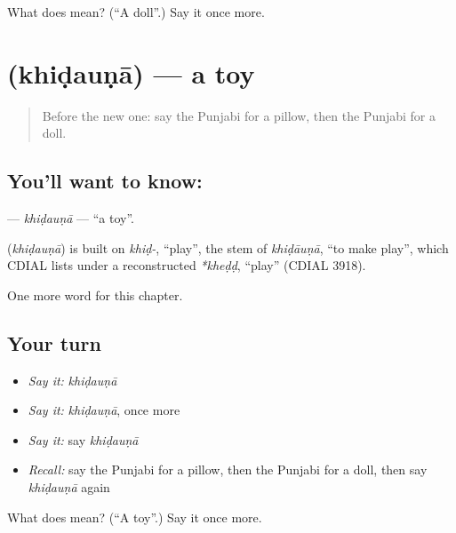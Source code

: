 \begin{tcolorbox}[breakable,colback=teal!4,colframe=teal!35!black,title={Before you move on}]
What does  mean? (\textquotedblleft{}A doll\textquotedblright{}.) Say it once more.
\end{tcolorbox}
\section[\texorpdfstring{\pa{ਖਿਡੌਣਾ} (khiḍauṇā)}{ਖਿਡੌਣਾ (khiḍauṇā)}]{ (khiḍauṇā) — a toy}

\label{lesson:PA-C118-khidauna}



\begin{quote}
Before the new one: say the Punjabi for a pillow, then the Punjabi for a doll.
\end{quote}

\subsection*{You'll want to know: }
\textbf{} — \emph{khiḍauṇā} — \textquotedblleft{}a toy\textquotedblright{}.

\begin{cousinweb}
\textbf{} (\emph{khiḍauṇā}) is built on \emph{khiḍ-}, \textquotedblleft{}play\textquotedblright{}, the stem of \emph{khiḍāuṇā}, \textquotedblleft{}to make play\textquotedblright{}, which CDIAL lists under a reconstructed \emph{*kheḍḍ}, \textquotedblleft{}play\textquotedblright{} (CDIAL 3918).
\end{cousinweb}

\begin{grammarlens}[title={What you've built}]
One more word for this chapter.
\end{grammarlens}

\subsection*{Your turn}
\begin{itemize}
\raggedright
  \item \emph{Say it:} \emph{khiḍauṇā}
  \item \emph{Say it:} \emph{khiḍauṇā}, once more
  \item \emph{Say it:} say \emph{khiḍauṇā}
  \item \emph{Recall:} say the Punjabi for a pillow, then the Punjabi for a doll, then say \emph{khiḍauṇā} again
\end{itemize}

\begin{tcolorbox}[breakable,colback=teal!4,colframe=teal!35!black,title={Before you move on}]
What does  mean? (\textquotedblleft{}A toy\textquotedblright{}.) Say it once more.
\end{tcolorbox}
